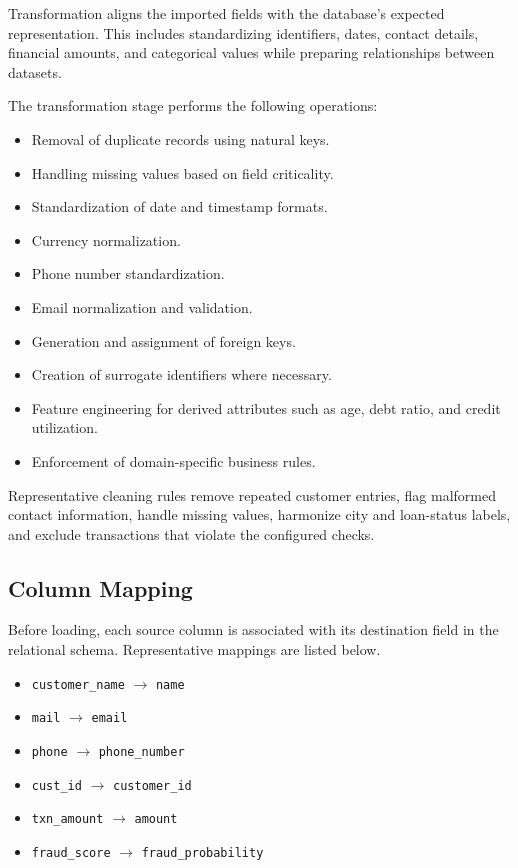 \documentclass[conference]{IEEEtran}
\begin{document}
Transformation aligns the imported fields with the database's expected representation. This includes standardizing identifiers, dates, contact details, financial amounts, and categorical values while preparing relationships between datasets.

The transformation stage performs the following operations:

\begin{itemize}
    \item Removal of duplicate records using natural keys.
    \item Handling missing values based on field criticality.
    \item Standardization of date and timestamp formats.
    \item Currency normalization.
    \item Phone number standardization.
    \item Email normalization and validation.
    \item Generation and assignment of foreign keys.
    \item Creation of surrogate identifiers where necessary.
    \item Feature engineering for derived attributes such as age, debt ratio, and credit utilization.
    \item Enforcement of domain-specific business rules.
\end{itemize}

Representative cleaning rules remove repeated customer entries, flag malformed contact information, handle missing values, harmonize city and loan-status labels, and exclude transactions that violate the configured checks.

\subsection{Column Mapping}

Before loading, each source column is associated with its destination field in the relational schema. Representative mappings are listed below.

\begin{itemize}
    \item \texttt{customer\_name} $\rightarrow$ \texttt{name}
    \item \texttt{mail} $\rightarrow$ \texttt{email}
    \item \texttt{phone} $\rightarrow$ \texttt{phone\_number}
    \item \texttt{cust\_id} $\rightarrow$ \texttt{customer\_id}
    \item \texttt{txn\_amount} $\rightarrow$ \texttt{amount}
    \item \texttt{fraud\_score} $\rightarrow$ \texttt{fraud\_probability}
\end{itemize}
\end{document}
